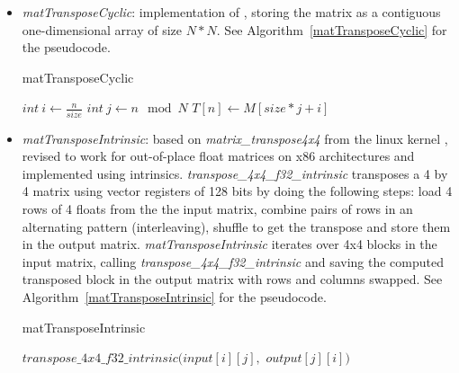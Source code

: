 \documentclass[conference]{IEEEtran}
\begin{document}
\begin{itemize}
\item \textit{matTransposeCyclic}: implementation of \cite{b13}, storing the matrix as a contiguous one-dimensional array of size $N*N$. See Algorithm~\ref{matTransposeCyclic} for the pseudocode.
  \begin{algorithm}
  	\caption{matTransposeCyclic}\label{matTransposeCyclic}
  \begin{algorithmic}[1]

        \State $int\ \textit{i} \gets \frac{n}{size}$
        \State $int\ \textit{j} \gets n \mod N$
        \State $T[n] \gets M[size * j + i]$
        \EndFor
          \end{algorithmic}
  \end{algorithm}

\item \textit{matTransposeIntrinsic}: based on \textit{matrix\_transpose4x4} from the linux kernel \cite{b16}, revised to work for out-of-place float matrices on x86 architectures and implemented using intrinsics. \textit{transpose\_4x4\_f32\_intrinsic} transposes a 4 by 4 matrix using vector registers of 128 bits by doing the following steps: load 4 rows of 4 floats from the the input matrix, combine pairs of rows in an alternating pattern (interleaving), shuffle to get the transpose and store them in the output matrix. \textit{matTransposeIntrinsic} iterates over 4x4 blocks in the input matrix, calling \textit{transpose\_4x4\_f32\_intrinsic} and saving the computed transposed block in the output matrix with rows and columns swapped. See Algorithm~\ref{matTransposeIntrinsic} for the pseudocode.
  \begin{algorithm}
	\caption{matTransposeIntrinsic}\label{matTransposeIntrinsic}
	    \begin{algorithmic}[1]

        \State $transpose\_4x4\_f32\_intrinsic(input[i][j],$
        \State $                               output[j][i])$
        \EndFor
        \EndFor


\end{algorithmic}
\end{algorithm}
\end{itemize}
\end{document}

